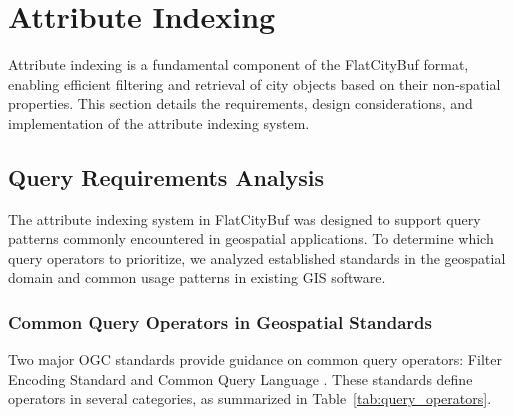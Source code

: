 
\section{Attribute Indexing}
\label{methodology:attribute_index}

Attribute indexing is a fundamental component of the FlatCityBuf format, enabling efficient filtering and retrieval of city objects based on their non-spatial properties. This section details the requirements, design considerations, and implementation of the attribute indexing system.

\subsection{Query Requirements Analysis}
\label{methodology:attribute_index:query_requirements}

The attribute indexing system in FlatCityBuf was designed to support query patterns commonly encountered in geospatial applications. To determine which query operators to prioritize, we analyzed established standards in the geospatial domain and common usage patterns in existing GIS software.

\subsubsection{Common Query Operators in Geospatial Standards}
\label{methodology:attribute_index:query_requirements:standards}

Two major OGC standards provide guidance on common query operators: Filter Encoding Standard \citep{ogc_filter_encoding_2010} and Common Query Language \citep{ogc_cql2_2024}. These standards define operators in several categories, as summarized in Table~\ref{tab:query_operators}.

